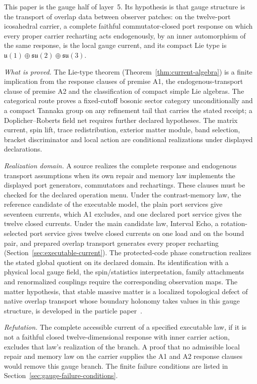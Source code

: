 \documentclass[11pt]{article}
\begin{document}
This paper is the gauge half of layer~5. Its hypothesis is that gauge
structure is the transport of overlap data between observer patches: on the
twelve-port icosahedral carrier, a complete faithful commutator-closed port
response on which every proper carrier recharting acts endogenously, by an
inner automorphism of the same response, is the local gauge current, and
its compact Lie type is \(\mathfrak u(1)\oplus\mathfrak{su}(2)\oplus
\mathfrak{su}(3)\).

\emph{What is proved.} The Lie-type theorem
(Theorem~\ref{thm:current-algebra}) is a finite implication from the
response clauses of premise A1, the endogenous-transport clause of premise
A2 and the classification of compact simple Lie algebras. The categorical
route proves a fixed-cutoff bosonic sector category unconditionally and a
compact Tannaka group on any refinement tail that carries the stated
receipt; a Doplicher--Roberts field net requires further declared
hypotheses. The matrix current, spin lift, trace redistribution, exterior
matter module, band selection, bracket discriminator and local action are
conditional realizations under displayed declarations.

\emph{Realization domain.} A source realizes the complete response and
endogenous transport assumptions when its own repair and memory law
implements the displayed port generators, commutators and rechartings.
These clauses must be checked for the declared operation menu. Under the
contrast-memory law, the reference candidate of the executable model, the
plain port services give seventeen currents, which A1 excludes, and one
declared port service gives the twelve closed currents. Under the main
candidate law, Interval Echo, a rotation-selected port service gives twelve
closed currents on one load and on the bound pair, and prepared overlap
transport generates every proper recharting
(Section~\ref{sec:executable-current}). The protected-code phase construction realizes the stated global
quotient on its declared domain. Its identification with a physical
local gauge field, the spin/statistics interpretation, family attachments
and renormalized couplings require the corresponding observation maps. The matter hypothesis, that stable massive
matter is a localized topological defect of native overlap transport whose
boundary holonomy takes values in this gauge structure, is developed in the
particle paper~\cite{ophparticles}.

\emph{Refutation.} The complete accessible current of a specified executable
law, if it is not a faithful closed twelve-dimensional response with inner
carrier action, excludes that law's realization of the branch. A proof that
no admissible local repair and memory law on the carrier supplies the A1 and
A2 response clauses would remove this gauge branch. The finite failure
conditions are listed in Section~\ref{sec:gauge-failure-conditions}.
\end{document}
